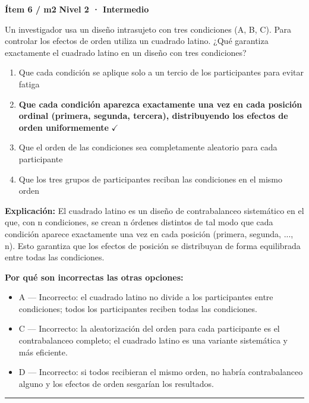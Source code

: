 \documentclass[12pt,a4paper]{article}
\begin{document}
\begin{mdframed}[backgroundcolor=fondogris,linecolor=ambar,linewidth=1pt,innerleftmargin=10pt,innerrightmargin=10pt,innertopmargin=7pt,innerbottommargin=7pt]
\textbf{Ítem 6 / m2} \hfill {\small\bfseries\color{ambar} Nivel 2 · Intermedio}
\end{mdframed}

Un investigador usa un diseño intrasujeto con tres condiciones (A, B, C). Para controlar los efectos de orden utiliza un cuadrado latino. ¿Qué garantiza exactamente el cuadrado latino en un diseño con tres condiciones?

\begin{enumerate}
  \item[A.] Que cada condición se aplique solo a un tercio de los participantes para evitar fatiga
  \item[\textbf{\color{verde}B.}] \textbf{\color{verde} Que cada condición aparezca exactamente una vez en cada posición ordinal (primera, segunda, tercera), distribuyendo los efectos de orden uniformemente} \hfill $\checkmark$
  \item[C.] Que el orden de las condiciones sea completamente aleatorio para cada participante
  \item[D.] Que los tres grupos de participantes reciban las condiciones en el mismo orden
\end{enumerate}

\noindent\textbf{\color{azul}Explicación:} El cuadrado latino es un diseño de contrabalanceo sistemático en el que, con n condiciones, se crean n órdenes distintos de tal modo que cada condición aparece exactamente una vez en cada posición (primera, segunda, ..., n). Esto garantiza que los efectos de posición se distribuyan de forma equilibrada entre todas las condiciones.

\noindent\textbf{\color{gris}Por qué son incorrectas las otras opciones:}
\begin{itemize}
  \item {\small A — Incorrecto: el cuadrado latino no divide a los participantes entre condiciones; todos los participantes reciben todas las condiciones.}
  \item {\small C — Incorrecto: la aleatorización del orden para cada participante es el contrabalanceo completo; el cuadrado latino es una variante sistemática y más eficiente.}
  \item {\small D — Incorrecto: si todos recibieran el mismo orden, no habría contrabalanceo alguno y los efectos de orden sesgarían los resultados.}
\end{itemize}
\vspace{8pt}\hrule\vspace{10pt}
\end{document}
